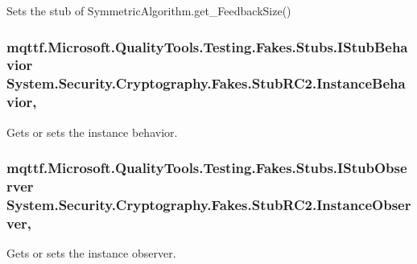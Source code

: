 Sets the stub of Symmetric\-Algorithm.\-get\-\_\-\-Feedback\-Size()

\hypertarget{class_system_1_1_security_1_1_cryptography_1_1_fakes_1_1_stub_r_c2_a61b6c4bc2fb3d1b5a58af58d7d4dea51}{
\subsubsection[{Instance\-Behavior}]{\setlength{\rightskip}{0pt plus 5cm}mqttf.\-Microsoft.\-Quality\-Tools.\-Testing.\-Fakes.\-Stubs.\-I\-Stub\-Behavior System.\-Security.\-Cryptography.\-Fakes.\-Stub\-R\-C2.\-Instance\-Behavior\hspace{0.3cm}{\ttfamily [get]}, {\ttfamily [set]}}}\label{class_system_1_1_security_1_1_cryptography_1_1_fakes_1_1_stub_r_c2_a61b6c4bc2fb3d1b5a58af58d7d4dea51}


Gets or sets the instance behavior.

\hypertarget{class_system_1_1_security_1_1_cryptography_1_1_fakes_1_1_stub_r_c2_a99b1bd0841640432ff8fdc794bbcfcde}{
\subsubsection[{Instance\-Observer}]{\setlength{\rightskip}{0pt plus 5cm}mqttf.\-Microsoft.\-Quality\-Tools.\-Testing.\-Fakes.\-Stubs.\-I\-Stub\-Observer System.\-Security.\-Cryptography.\-Fakes.\-Stub\-R\-C2.\-Instance\-Observer\hspace{0.3cm}{\ttfamily [get]}, {\ttfamily [set]}}}\label{class_system_1_1_security_1_1_cryptography_1_1_fakes_1_1_stub_r_c2_a99b1bd0841640432ff8fdc794bbcfcde}


Gets or sets the instance observer.

